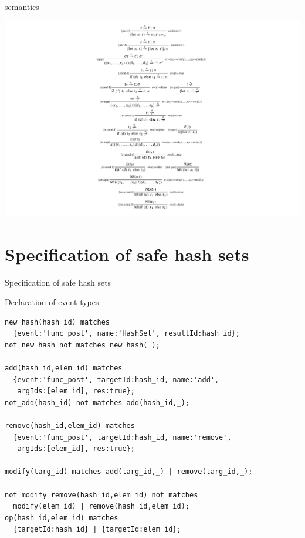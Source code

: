 \documentclass[10pt,usenames,dvipsnames]{beamer}
\begin{document}
\begin{frame}{\rml semantics}
  \begin{center}
    \includegraphics[keepaspectratio,height=0.85\textheight]{images/semantics}
  \end{center}
\end{frame}


\section{Specification of safe hash sets}

\begin{frame}[fragile]{Specification of safe hash sets}
  \begin{block}{Declaration of event types}
    \begin{lstlisting}[basicstyle=\ttfamily\scriptsize]
new_hash(hash_id) matches
  {event:'func_post', name:'HashSet', resultId:hash_id};
not_new_hash not matches new_hash(_);

add(hash_id,elem_id) matches
  {event:'func_post', targetId:hash_id, name:'add',
   argIds:[elem_id], res:true};
not_add(hash_id) not matches add(hash_id,_);

remove(hash_id,elem_id) matches
  {event:'func_post', targetId:hash_id, name:'remove',
   argIds:[elem_id], res:true};

modify(targ_id) matches add(targ_id,_) | remove(targ_id,_);

not_modify_remove(hash_id,elem_id) not matches
  modify(elem_id) | remove(hash_id,elem_id);
op(hash_id,elem_id) matches
  {targetId:hash_id} | {targetId:elem_id};      
    \end{lstlisting}
  \end{block}
\end{frame}
\end{document}
